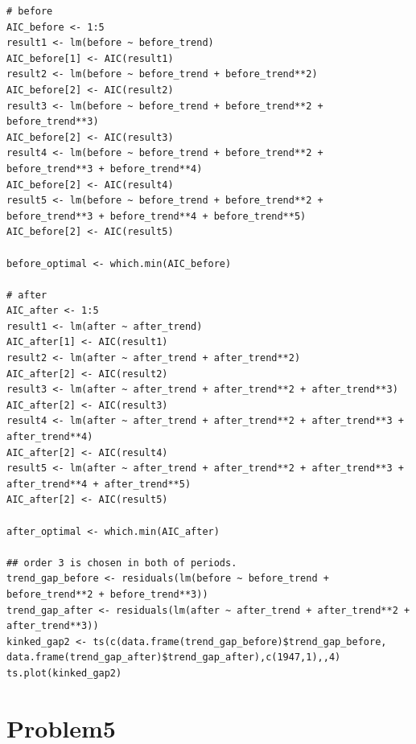 \documentclass{article}
\begin{document}
\begin{lstlisting}
# before
AIC_before <- 1:5
result1 <- lm(before ~ before_trend)
AIC_before[1] <- AIC(result1)
result2 <- lm(before ~ before_trend + before_trend**2)
AIC_before[2] <- AIC(result2)
result3 <- lm(before ~ before_trend + before_trend**2 + before_trend**3)
AIC_before[2] <- AIC(result3)
result4 <- lm(before ~ before_trend + before_trend**2 + before_trend**3 + before_trend**4)
AIC_before[2] <- AIC(result4)
result5 <- lm(before ~ before_trend + before_trend**2 + before_trend**3 + before_trend**4 + before_trend**5)
AIC_before[2] <- AIC(result5)

before_optimal <- which.min(AIC_before)

# after
AIC_after <- 1:5
result1 <- lm(after ~ after_trend)
AIC_after[1] <- AIC(result1)
result2 <- lm(after ~ after_trend + after_trend**2)
AIC_after[2] <- AIC(result2)
result3 <- lm(after ~ after_trend + after_trend**2 + after_trend**3)
AIC_after[2] <- AIC(result3)
result4 <- lm(after ~ after_trend + after_trend**2 + after_trend**3 + after_trend**4)
AIC_after[2] <- AIC(result4)
result5 <- lm(after ~ after_trend + after_trend**2 + after_trend**3 + after_trend**4 + after_trend**5)
AIC_after[2] <- AIC(result5)

after_optimal <- which.min(AIC_after)

## order 3 is chosen in both of periods.
trend_gap_before <- residuals(lm(before ~ before_trend + before_trend**2 + before_trend**3))
trend_gap_after <- residuals(lm(after ~ after_trend + after_trend**2 + after_trend**3))
kinked_gap2 <- ts(c(data.frame(trend_gap_before)$trend_gap_before, data.frame(trend_gap_after)$trend_gap_after),c(1947,1),,4)
ts.plot(kinked_gap2)
\end{lstlisting}

\section{Problem5}
\end{document}
